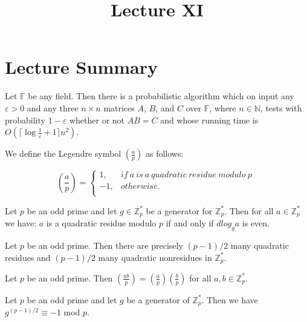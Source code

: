 \documentclass[a4paper]{article}
\title{\vspace{-2cm}Lecture XI\vspace{-2cm}}
\date{}
\begin{document}
\maketitle
\section{Lecture Summary}
\begin{theorem}
Let $\mathbb{F}$ be any field. Then there is a probabilistic algorithm which on input any $\varepsilon > 0$ and any three $n \times n$ matrices $A$, $B$, and $C$ over $\mathbb{F}$, where $n \in \mathbb{N}$, tests with probability $1 - \varepsilon$ whether or not $AB = C$ and whose running time is $O(\lceil \log{\frac{1}{\varepsilon}} + 1 \rceil n^{2})$.
\end{theorem}


\begin{definition}
We define the Legendre symbol $\left( \frac{a}{p} \right)$ as follows:
\begin{center}
\[ 
\left( \frac{a}{p} \right) = \left\{
\begin{array}{ll}
      1, & if\ a\ is\ a\ quadratic\ residue\ modulo\ p\; \\
      -1, & otherwise.\\
\end{array} 
\right. 
\]
\end{center}
\end{definition}


\begin{theorem}
Let $p$ be an odd prime and let $g \in \mathbb{Z}_{p}^{*}$ be a generator for $\mathbb{Z}_{p}^{*}$. Then for all $a \in \mathbb{Z}_{p}^{*}$ we have: $a$ is a quadratic residue modulo $p$ if and only if $dlog_{g}a$ is even.
\end{theorem}


\begin{corollary}
Let $p$ be an odd prime. Then there are precisely $(p - 1)/2$ many quadratic residues and $(p - 1)/2$ many quadratic nonresidues in $\mathbb{Z}_{p}^{*}$.
\end{corollary}


\begin{corollary}
Let $p$ be an odd prime. Then $\left( \frac{ab}{p} \right) = \left( \frac{a}{p} \right) \left( \frac{b}{p} \right)$ for all $a, b \in \mathbb{Z}_{p}^{*}$.
\end{corollary}


\begin{theorem}
Let $p$ be an odd prime and let $g$ be a generator of $\mathbb{Z}_{p}^{*}$. Then we have $g^{(p - 1) / 2} \equiv -1$ mod $p$.
\end{theorem}
\end{document}
